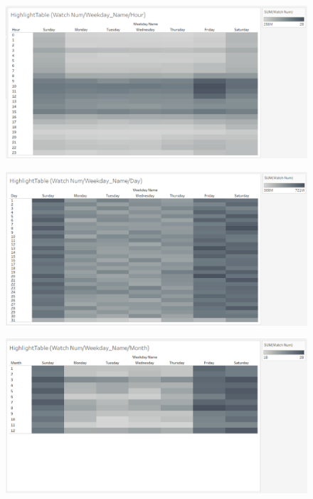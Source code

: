 \documentclass[submit,techrep,noauthor]{ipsj}
\begin{document}
\begin{figure}[h]
\vspace{-1.0zh}
  \begin{minipage}[b]{0.49\columnwidth}
    \centering
    \hspace{-1.0zh}
    \includegraphics[width=\columnwidth]{./eps/HighlightTable_WatchNum_WeekdayNameHour.eps}
    \label{fig:highlighttable_watchnum_weekday_hour}
  \end{minipage}
  \begin{minipage}[b]{0.49\columnwidth}
    \centering
    \includegraphics[width=\columnwidth]{./eps/HighlightTable_WatchNum_WeekdayNameDay.eps}
    \label{fig:highlighttable_watchnum_weekday_day}
  \end{minipage}
  \begin{minipage}[b]{0.49\columnwidth}
    \centering
    \includegraphics[width=\columnwidth]{./eps/HighlightTable_WatchNum_WeekdayNameMonth.eps}

\end{minipage}
\end{figure}
\end{document}
